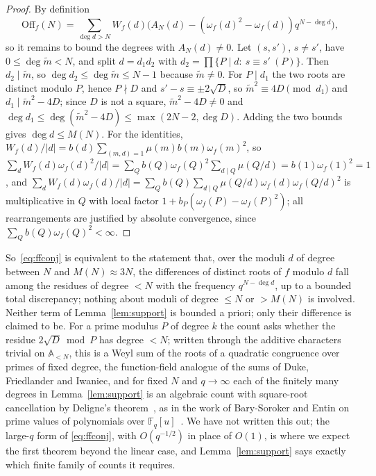 \documentclass[11pt,a4paper]{article}
\theoremstyle{remark}\newtheorem{remark}[theorem]{Remark}
\newcommand{\F}{\mathbb{F}}
\newcommand{\A}{\mathbb{A}}
\begin{document}
\begin{proof}
By definition
\[
\mathrm{Off}_f(N)=\sum_{\deg d>N}W_f(d)\bigl(A_N(d)-(\omega_f(d)^2-\omega_f(d))q^{N-\deg d}\bigr),
\]
so it remains to bound the degrees with $A_N(d)\ne0$. Let $(s,s')$, $s\ne s'$, have $0\le\deg\tilde m<N$,
and split $d=d_1d_2$ with $d_2=\prod\{P\mid d:\ s\equiv s'\ (P)\}$. Then $d_2\mid\tilde m$, so
$\deg d_2\le\deg\tilde m\le N-1$ because $\tilde m\ne0$. For $P\mid d_1$ the two roots are distinct modulo
$P$, hence $P\nmid D$ and $s'-s\equiv\pm2\sqrt D$, so $\tilde m^2\equiv4D\pmod{d_1}$ and
$d_1\mid\tilde m^2-4D$; since $D$ is not a square, $\tilde m^2-4D\ne0$ and
$\deg d_1\le\deg(\tilde m^2-4D)\le\max(2N-2,\deg D)$. Adding the two bounds gives $\deg d\le M(N)$. For
the identities, $W_f(d)/|d|=b(d)\sum_{(m,d)=1}\mu(m)b(m)\omega_f(m)^2$, so
$\sum_dW_f(d)\omega_f(d)^2/|d|=\sum_Qb(Q)\omega_f(Q)^2\sum_{d\mid Q}\mu(Q/d)=b(1)\omega_f(1)^2=1$, and
$\sum_dW_f(d)\omega_f(d)/|d|=\sum_Qb(Q)\sum_{d\mid Q}\mu(Q/d)\omega_f(d)\omega_f(Q/d)^2$ is multiplicative
in $Q$ with local factor $1+b_P(\omega_f(P)-\omega_f(P)^2)$; all rearrangements are justified by absolute
convergence, since $\sum_Qb(Q)\omega_f(Q)^2<\infty$.
\end{proof}

So~\eqref{eq:ffconj} is equivalent to the statement that, over the moduli $d$ of degree between $N$ and
$M(N)\approx3N$, the differences of distinct roots of $f$ modulo $d$ fall among the residues of degree
$<N$ with the frequency $q^{N-\deg d}$, up to a bounded total discrepancy; nothing about moduli of degree
$\le N$ or $>M(N)$ is involved. Neither term of Lemma~\ref{lem:support} is bounded a priori; only their
difference is claimed to be. For a prime modulus $P$ of degree $k$ the count asks whether the residue
$2\sqrt D\bmod P$ has degree $<N$; written through the additive characters trivial on $\A_{<N}$, this is
a Weyl sum of the roots of a quadratic congruence over primes of fixed degree, the function-field
analogue of the sums of Duke, Friedlander and Iwaniec, and for fixed $N$ and $q\to\infty$ each of the
finitely many degrees in Lemma~\ref{lem:support} is an algebraic count with square-root cancellation by
Deligne's theorem~\cite{Katz1988}, as in the work of Bary-Soroker and Entin on prime values of
polynomials over $\F_q[u]$~\cite{BarySoroker2012,Entin2016}. We have not written this out; the large-$q$
form of \eqref{eq:ffconj}, with $O(q^{-1/2})$ in place of $O(1)$, is where we expect the first theorem
beyond the linear case, and Lemma~\ref{lem:support} says exactly which finite family of counts it
requires.
\end{document}
